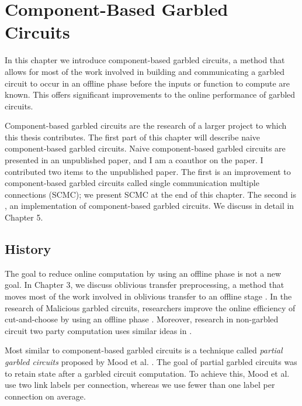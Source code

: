 
\chapter{Component-Based Garbled Circuits}

In this chapter we introduce component-based garbled circuits, a method that allows for most of the work involved in building and communicating a garbled circuit to occur in an offline phase before the inputs or function to compute are known. 
This offers significant improvements to the online performance of garbled circuits. 

Component-based garbled circuits are the research of a larger project to which this thesis contributes. 
The first part of this chapter will describe naive component-based garbled circuits. 
Naive component-based garbled circuits are presented in an unpublished paper, and I am a coauthor on the paper. 
I contributed two items to the unpublished paper.
The first is an improvement to component-based garbled circuits called single communication multiple connections (SCMC); we present SCMC at the end of this chapter. 
The second is \CompGC, an implementation of component-based garbled circuits. 
We discuss \CompGC in detail in Chapter 5. 

\section{History}
The goal to reduce online computation by using an offline phase is not a new goal.
In Chapter 3, we discuss oblivious transfer preprocessing, a method that moves most of the work involved in oblivious transfer to an offline stage \cite{Bea95}. 
In the research of Malicious garbled circuits, researchers improve the online efficiency of cut-and-choose by using an offline phase \cite{HKK14, LR14, LR15}.
Moreover, research in non-garbled circuit two party computation uses similar ideas in \cite{DPSZ12, NNOB12}. 

Most similar to component-based garbled circuits is a technique called \textit{partial garbled circuits} proposed by Mood et al. \cite{MGBF14}. 
The goal of partial garbled circuits was to retain state after a garbled circuit computation. 
To achieve this, Mood et al. use two link labels per connection, whereas we use fewer than one label per connection on average.   

